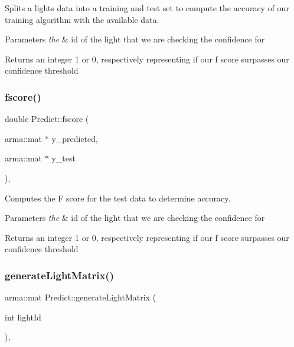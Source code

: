 Splits a lights data into a training and test set to compute the accuracy of our training algorithm with the available data.


\begin{DoxyParams}{Parameters}
{\em the} & id of the light that we are checking the confidence for \\
\hline
\end{DoxyParams}
\begin{DoxyReturn}{Returns}
an integer 1 or 0, respectively representing if our f score surpasses our confidence threshold 
\end{DoxyReturn}
\mbox{\label{class_predict_a5b43a54e1dea7d5198d8f551670fdc65}} 
\subsubsection{\texorpdfstring{fscore()}{fscore()}}
{\footnotesize\ttfamily double Predict\+::fscore (\begin{DoxyParamCaption}\item[{arma\+::mat $\ast$}]{y\+\_\+predicted,  }\item[{arma\+::mat $\ast$}]{y\+\_\+test }\end{DoxyParamCaption})\hspace{0.3cm}{\ttfamily [static]}, {\ttfamily [private]}}

Computes the F score for the test data to determine accuracy.


\begin{DoxyParams}{Parameters}
{\em the} & id of the light that we are checking the confidence for \\
\hline
\end{DoxyParams}
\begin{DoxyReturn}{Returns}
an integer 1 or 0, respectively representing if our f score surpasses our confidence threshold 
\end{DoxyReturn}
\mbox{\label{class_predict_a9abe08bc86d298515354df348bfb3296}} 
\subsubsection{\texorpdfstring{generate\+Light\+Matrix()}{generateLightMatrix()}}
{\footnotesize\ttfamily arma\+::mat Predict\+::generate\+Light\+Matrix (\begin{DoxyParamCaption}\item[{int}]{light\+Id }\end{DoxyParamCaption})\hspace{0.3cm}{\ttfamily [static]}, {\ttfamily [private]}}

